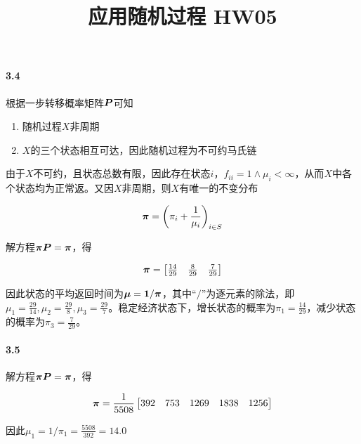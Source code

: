 \documentclass{../notes}
\title{应用随机过程 HW05}
\begin{document}
    \maketitle

    \paragraph*{3.4} 根据一步转移概率矩阵$\boldsymbol P$可知

    \begin{enumerate}
        \item 随机过程$X$非周期
        \item $X$的三个状态相互可达，因此随机过程为不可约马氏链
    \end{enumerate}

    由于$X$不可约，且状态总数有限，因此存在状态$i$，$f_{ii} = 1\land \mu_i < \infty$，从而$X$中各个状态均为正常返。又因$X$非周期，则$X$有唯一的不变分布

    \begin{equation}
        \boldsymbol \pi = \left(\pi_i + \frac{1}{\mu_i}\right)_{i\in S}
    \end{equation}

    解方程$\boldsymbol \pi \boldsymbol P = \boldsymbol \pi$，得

    \begin{equation}
        \boldsymbol \pi = \begin{bmatrix}
            \frac{14}{29} & \frac{8}{29} & \frac{7}{29}
        \end{bmatrix}
    \end{equation}

    因此状态的平均返回时间为$\boldsymbol \mu = \boldsymbol 1 / \boldsymbol \pi$，其中“$/$”为逐元素的除法，即$\mu_1 = \frac{29}{14}, \mu_2 = \frac{29}{8}, \mu_3 = \frac{29}{7}$。稳定经济状态下，增长状态的概率为$\pi_1 = \frac{14}{29}$，减少状态的概率为$\pi_3 = \frac{7}{29}$。

    \paragraph*{3.5} 解方程$\boldsymbol \pi \boldsymbol P = \boldsymbol \pi$，得

    \begin{equation}
        \boldsymbol \pi = \frac{1}{5508}\begin{bmatrix}
            392 & 753 & 1269 & 1838 & 1256
        \end{bmatrix}
    \end{equation}

    因此$\mu_1 = 1 / \pi_1 = \frac{5508}{392} = 14.0$
\end{document}
